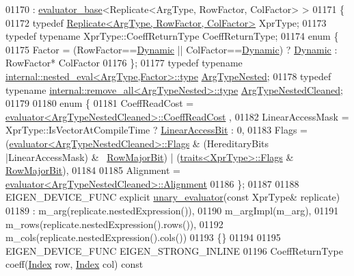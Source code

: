 \begin{DoxyCode}
01170   : \hyperlink{struct_eigen_1_1internal_1_1evaluator__base}{evaluator\_base}<Replicate<ArgType, RowFactor, ColFactor> >
01171 \{
01172   \textcolor{keyword}{typedef} \hyperlink{group___core___module_class_eigen_1_1_replicate}{Replicate<ArgType, RowFactor, ColFactor>} XprType;
01173   \textcolor{keyword}{typedef} \textcolor{keyword}{typename} XprType::CoeffReturnType CoeffReturnType;
01174   \textcolor{keyword}{enum} \{
01175     Factor = (RowFactor==\hyperlink{namespace_eigen_ad81fa7195215a0ce30017dfac309f0b2}{Dynamic} || ColFactor==\hyperlink{namespace_eigen_ad81fa7195215a0ce30017dfac309f0b2}{Dynamic}) ? \hyperlink{namespace_eigen_ad81fa7195215a0ce30017dfac309f0b2}{Dynamic} : RowFactor*
      ColFactor
01176   \};
01177   \textcolor{keyword}{typedef} \textcolor{keyword}{typename} \hyperlink{class_eigen_1_1internal_1_1_tensor_lazy_evaluator_writable}{internal::nested\_eval<ArgType,Factor>::type} 
      \hyperlink{class_eigen_1_1internal_1_1_tensor_lazy_evaluator_writable}{ArgTypeNested};
01178   \textcolor{keyword}{typedef} \textcolor{keyword}{typename} \hyperlink{group___sparse_core___module_class_eigen_1_1_triplet}{internal::remove\_all<ArgTypeNested>::type} 
      \hyperlink{group___sparse_core___module_class_eigen_1_1_triplet}{ArgTypeNestedCleaned};
01179   
01180   \textcolor{keyword}{enum} \{
01181     CoeffReadCost = \hyperlink{struct_eigen_1_1internal_1_1evaluator}{evaluator<ArgTypeNestedCleaned>::CoeffReadCost}
      ,
01182     LinearAccessMask = XprType::IsVectorAtCompileTime ? \hyperlink{group__flags_ga4b983a15d57cd55806df618ac544d09e}{LinearAccessBit} : 0,
01183     Flags = (\hyperlink{struct_eigen_1_1internal_1_1evaluator}{evaluator<ArgTypeNestedCleaned>::Flags} & (HereditaryBits
      |LinearAccessMask) & ~\hyperlink{group__flags_gae4f56c2a60bbe4bd2e44c5b19cbe8762}{RowMajorBit}) | (\hyperlink{struct_eigen_1_1internal_1_1traits}{traits<XprType>::Flags} & 
      \hyperlink{group__flags_gae4f56c2a60bbe4bd2e44c5b19cbe8762}{RowMajorBit}),
01184     
01185     Alignment = \hyperlink{struct_eigen_1_1internal_1_1evaluator}{evaluator<ArgTypeNestedCleaned>::Alignment}
01186   \};
01187 
01188   EIGEN\_DEVICE\_FUNC \textcolor{keyword}{explicit} \hyperlink{struct_eigen_1_1internal_1_1unary__evaluator}{unary\_evaluator}(\textcolor{keyword}{const} XprType& replicate)
01189     : m\_arg(replicate.nestedExpression()),
01190       m\_argImpl(m\_arg),
01191       m\_rows(replicate.nestedExpression().rows()),
01192       m\_cols(replicate.nestedExpression().cols())
01193   \{\}
01194  
01195   EIGEN\_DEVICE\_FUNC EIGEN\_STRONG\_INLINE
01196   CoeffReturnType coeff(\hyperlink{namespace_eigen_a62e77e0933482dafde8fe197d9a2cfde}{Index} row, \hyperlink{namespace_eigen_a62e77e0933482dafde8fe197d9a2cfde}{Index} col)\textcolor{keyword}{ const}

\end{DoxyCode}
